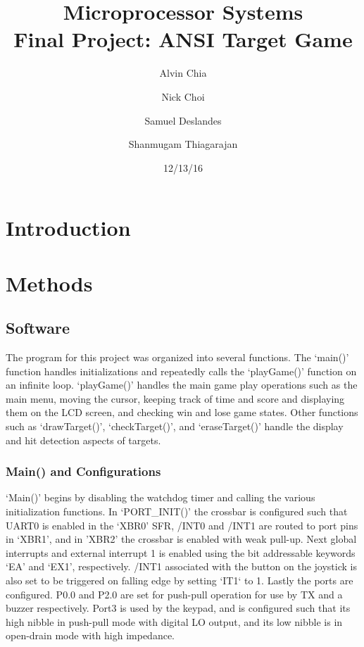 \documentclass[12pt]{article}
\begin{document}
\title{Microprocessor Systems\\ Final Project: ANSI Target Game}
\author{Alvin Chia \and Nick Choi \and Samuel Deslandes \and Shanmugam Thiagarajan}
\date{12/13/16}
\maketitle
\pagebreak
\section{Introduction}



\section{Methods}
\subsection{Software}
The program for this project was organized into several functions. The `main()' function handles initializations and repeatedly calls the `playGame()' function on an infinite loop. `playGame()' handles the main game play operations such as the main menu, moving the cursor, keeping track of time and score and displaying them on the LCD screen, and checking win and lose game states. Other functions such as `drawTarget()', `checkTarget()', and `eraseTarget()' handle the display and hit detection aspects of targets. 

\subsubsection{Main() and Configurations}
`Main()' begins by disabling the watchdog timer and calling the various initialization functions. In `PORT\_INIT()' the crossbar is configured such that UART0 is enabled in the `XBR0' SFR, /INT0 and /INT1 are routed to port pins in `XBR1', and in 'XBR2' the crossbar is enabled with weak pull-up. Next global interrupts and external interrupt 1 is enabled using the bit addressable keywords `EA' and `EX1', respectively. /INT1 associated with the button on the joystick is also set to be triggered on falling edge by setting `IT1` to 1. Lastly the ports are configured. P0.0 and P2.0 are set for push-pull operation for use by TX and a buzzer respectively. Port3 is used by the keypad, and is configured such that its high nibble in push-pull mode with digital LO output, and its low nibble is in open-drain mode with high impedance. 
\end{document}
